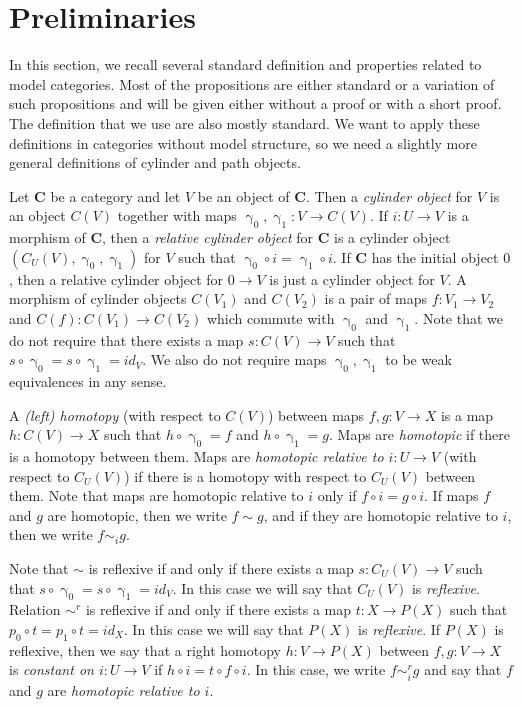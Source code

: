 \documentclass{tac}
\theoremstyle{definition}
\newcommand{\cat}[1]{\mathbf{#1}}
\newcommand{\C}{\cat{C}}
\newcommand{\cyli}{\upgamma}
\begin{document}
\section{Preliminaries}
\label{sec:preliminaries}

In this section, we recall several standard definition and properties related to model categories.
Most of the propositions are either standard or a variation of such propositions and will be given either without a proof or with a short proof.
The definition that we use are also mostly standard.
We want to apply these definitions in categories without model structure, so we need a slightly more general definitions of cylinder and path objects.

Let $\C$ be a category and let $V$ be an object of $\C$.
Then a \emph{cylinder object} for $V$ is an object $C(V)$ together with maps $\cyli_0,\cyli_1 : V \to C(V)$.
If $i : U \to V$ is a morphism of $\C$, then a \emph{relative cylinder object} for $\C$
is a cylinder object $(C_U(V),\cyli_0,\cyli_1)$ for $V$ such that $\cyli_0 \circ i = \cyli_1 \circ i$.
If $\C$ has the initial object $0$, then a relative cylinder object for $0 \to V$ is just a cylinder object for $V$.
A morphism of cylinder objects $C(V_1)$ and $C(V_2)$ is a pair of maps $f : V_1 \to V_2$ and $C(f) : C(V_1) \to C(V_2)$ which commute with $\cyli_0$ and $\cyli_1$.
Note that we do not require that there exists a map $s : C(V) \to V$ such that $s \circ \cyli_0 = s \circ \cyli_1 = id_V$.
We also do not require maps $\cyli_0,\cyli_1$ to be weak equivalences in any sense.

A \emph{(left) homotopy} (with respect to $C(V)$) between maps $f,g : V \to X$ is a map $h : C(V) \to X$ such that $h \circ \cyli_0 = f$ and $h \circ \cyli_1 = g$.
Maps are \emph{homotopic} if there is a homotopy between them.
Maps are \emph{homotopic relative to $i : U \to V$} (with respect to $C_U(V)$) if there is a homotopy with respect to $C_U(V)$ between them.
Note that maps are homotopic relative to $i$ only if $f \circ i = g \circ i$.
If maps $f$ and $g$ are homotopic, then we write $f \sim g$, and if they are homotopic relative to $i$, then we write $f \sim_i g$.

Note that $\sim$ is reflexive if and only if there exists a map $s : C_U(V) \to V$ such that $s \circ \cyli_0 = s \circ \cyli_1 = id_V$.
In this case we will say that $C_U(V)$ is \emph{reflexive}.
Relation $\sim^r$ is reflexive if and only if there exists a map $t : X \to P(X)$ such that $p_0 \circ t = p_1 \circ t = id_X$.
In this case we will say that $P(X)$ is \emph{reflexive}.
If $P(X)$ is reflexive, then we say that a right homotopy $h : V \to P(X)$ between $f,g : V \to X$
is \emph{constant on $i : U \to V$} if $h \circ i = t \circ f \circ i$.
In this case, we write $f \sim^r_i g$ and say that $f$ and $g$ are \emph{homotopic relative to $i$}.
\end{document}
